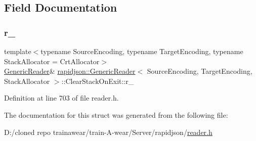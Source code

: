 \subsection{Field Documentation}
\mbox{\label{structrapidjson_1_1_generic_reader_1_1_clear_stack_on_exit_ad6a9442b2d01b5d2d23b354f30091ca7}} 
\subsubsection{\texorpdfstring{r\_}{r\_}}
{\footnotesize\ttfamily template$<$typename Source\+Encoding, typename Target\+Encoding, typename Stack\+Allocator = Crt\+Allocator$>$ \\
\mbox{\hyperlink{classrapidjson_1_1_generic_reader}{Generic\+Reader}}\& \mbox{\hyperlink{classrapidjson_1_1_generic_reader}{rapidjson\+::\+Generic\+Reader}}$<$ Source\+Encoding, Target\+Encoding, Stack\+Allocator $>$\+::Clear\+Stack\+On\+Exit\+::r\+\_\+\hspace{0.3cm}{\ttfamily [private]}}



Definition at line 703 of file reader.\+h.



The documentation for this struct was generated from the following file\+:\begin{DoxyCompactItemize}
\item 
D\+:/cloned repo trainawear/train-\/\+A-\/wear/\+Server/rapidjson/\mbox{\hyperlink{reader_8h}{reader.\+h}}\end{DoxyCompactItemize}
